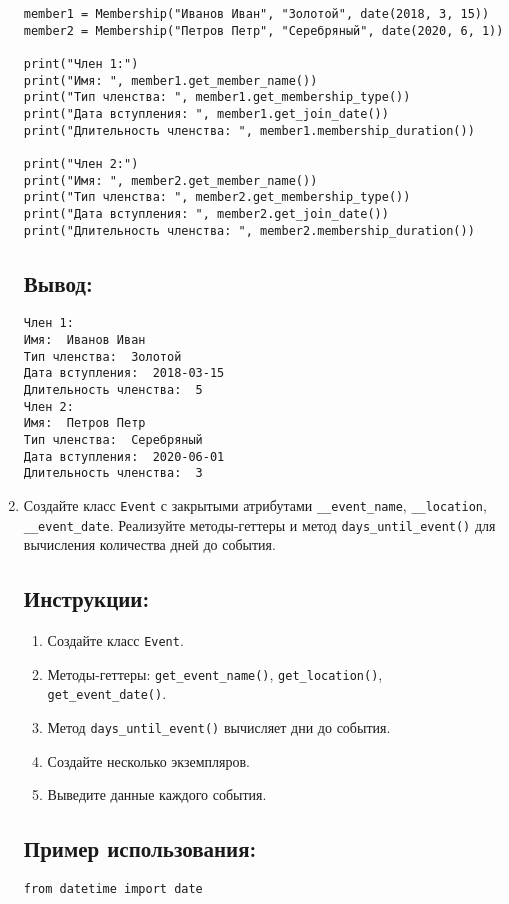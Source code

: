 \begin{enumerate}
\begin{lstlisting}[caption=Пример кода]
member1 = Membership("Иванов Иван", "Золотой", date(2018, 3, 15))
member2 = Membership("Петров Петр", "Серебряный", date(2020, 6, 1))

print("Член 1:")
print("Имя: ", member1.get_member_name())
print("Тип членства: ", member1.get_membership_type())
print("Дата вступления: ", member1.get_join_date())
print("Длительность членства: ", member1.membership_duration())

print("Член 2:")
print("Имя: ", member2.get_member_name())
print("Тип членства: ", member2.get_membership_type())
print("Дата вступления: ", member2.get_join_date())
print("Длительность членства: ", member2.membership_duration())
\end{lstlisting}

\subsection*{Вывод:}
\begin{lstlisting}[caption=Ожидаемый вывод]
Член 1:
Имя:  Иванов Иван
Тип членства:  Золотой
Дата вступления:  2018-03-15
Длительность членства:  5
Член 2:
Имя:  Петров Петр
Тип членства:  Серебряный
Дата вступления:  2020-06-01
Длительность членства:  3
\end{lstlisting}

\item
Создайте класс \texttt{Event} с закрытыми атрибутами \texttt{\_\_event\_name}, \texttt{\_\_location}, \texttt{\_\_event\_date}. Реализуйте методы-геттеры и метод \texttt{days\_until\_event()} для вычисления количества дней до события.

\subsection*{Инструкции:}
\begin{enumerate}
    \item Создайте класс \texttt{Event}.
    \item Методы-геттеры: \texttt{get\_event\_name()}, \texttt{get\_location()}, \texttt{get\_event\_date()}.
    \item Метод \texttt{days\_until\_event()} вычисляет дни до события.
    \item Создайте несколько экземпляров.
    \item Выведите данные каждого события.
\end{enumerate}

\subsection*{Пример использования:}
\begin{lstlisting}[caption=Пример кода]
from datetime import date


\end{lstlisting}
\end{enumerate}
